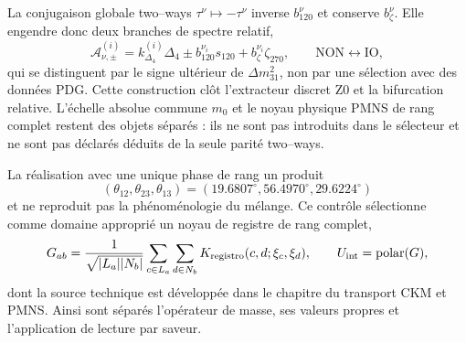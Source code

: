 La conjugaison globale two--ways
\(\tau^\nu\mapsto-\tau^\nu\) inverse
\(b_{120}^\nu\) et conserve \(b_\zeta^\nu\). Elle engendre donc deux
branches de spectre relatif,
\begin{equation}
 \mathcal A_{\nu,\pm}^{(i)}
 =k_{\Delta_4}^{(i)}\Delta_4
  \pm b_{120}^{\nu_i}s_{120}
  +b_\zeta^{\nu_i}\zeta_{270},
 \qquad
 \text{NON}\longleftrightarrow\text{IO},
 \label{eq:bifurcacion-neutra-no-io-rev2}
\end{equation}
qui se distinguent par le signe ultérieur de
\(\Delta m_{31}^2\), non par une sélection avec des données PDG. Cette construction
clôt l'extracteur discret Z0 et la bifurcation relative. L'échelle absolue
commune \(m_0\) et le noyau physique PMNS de rang complet restent des objets
séparés : ils ne sont pas introduits dans le sélecteur et ne sont pas déclarés
déduits de la seule parité two--ways.

La réalisation avec une unique phase de rang un produit
\[
 (\theta_{12},\theta_{23},\theta_{13})
 =(19.6807^\circ,56.4970^\circ,29.6224^\circ)
\]
et ne reproduit pas la phénoménologie du mélange. Ce contrôle sélectionne comme domaine approprié un
noyau de registre de rang complet,
\begin{equation}
 G_{ab}=\frac1{\sqrt{|L_a||N_b|}}
 \sum_{c\in L_a}\sum_{d\in N_b}
 K_{\rm registro}(c,d;\xi_c,\xi_d),
 \qquad U_{\rm int}=\operatorname{polar}(G),
 \label{eq:kernel-registro-rango-completo-rev2}
\end{equation}
dont la source technique est développée dans le chapitre du transport CKM et
PMNS. Ainsi sont séparés l'opérateur de masse, ses valeurs propres et l'application de
lecture par saveur.
